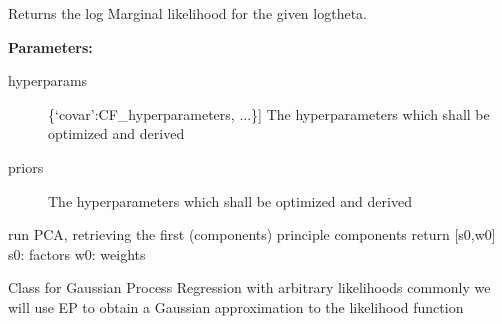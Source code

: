 \documentclass[letterpaper,10pt,english]{sphinxmanual}
\begin{document}
\begin{fulllineitems}
\begin{fulllineitems}
\begin{description}
\end{description}

\end{fulllineitems}


\begin{fulllineitems}
\label{gp:pygp.gp.gplvm.GPLVM.LMLgrad}
Returns the log Marginal likelihood for the given logtheta.

\textbf{Parameters:}
\begin{description}
\item[{hyperparams}] \leavevmode{[}\{`covar':CF\_hyperparameters, ...\}{]}
The hyperparameters which shall be optimized and derived

\item[{priors}] \leavevmode{[}{[}\code{lnpriors}{]}{]}
The hyperparameters which shall be optimized and derived

\end{description}

\end{fulllineitems}


\end{fulllineitems}


\begin{fulllineitems}
\label{gp:pygp.gp.gplvm.PCA}
run PCA, retrieving the first (components) principle components
return {[}s0,w0{]}
s0: factors
w0: weights

\end{fulllineitems}

\label{gp:module-pygp.gp.gprEP}
Class for Gaussian Process Regression with arbitrary likelihoods
commonly we will use EP to obtain a Gaussian approximation to the likelihood function
\end{document}
